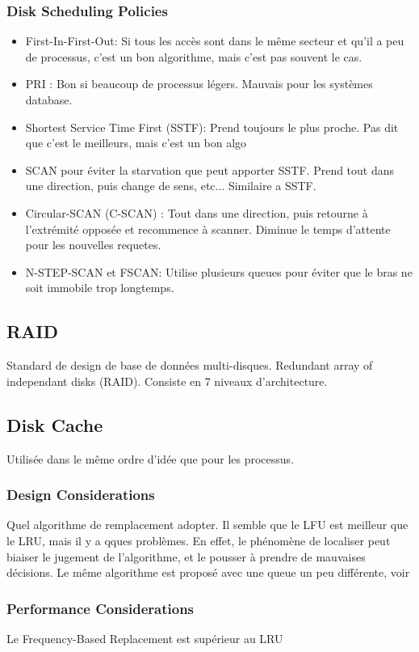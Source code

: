 \subsubsection{Disk Scheduling Policies}
\begin{itemize}
  \item First-In-First-Out: Si tous les accès sont dans le même secteur et qu'il a peu de processus, c'est un bon algorithme, mais c'est pas souvent le cas.
  \item PRI : Bon si beaucoup de processus légers.
    Mauvais pour les systèmes database.
  \item Shortest Service Time First (SSTF): Prend toujours le plus proche.
    Pas dit que c'est le meilleurs, mais c'est un bon algo
  \item SCAN pour éviter la starvation que peut apporter SSTF.
    Prend tout dans une direction, puis change de sens, etc...
    Similaire a SSTF.
  \item Circular-SCAN (C-SCAN) : Tout dans une direction, puis retourne à l'extrémité opposée et recommence à scanner.
    Diminue le temps d'attente pour les nouvelles requetes.
  \item N-STEP-SCAN et FSCAN: Utilise plusieurs queues pour éviter que le bras ne soit immobile trop longtemps.
\end{itemize}

\subsection{RAID}
Standard de design de base de données multi-disques.
Redundant array of independant disks (RAID).
Consiste en 7 niveaux d'architecture.
\subsection{Disk Cache}
Utilisée dans le même ordre d'idée que pour les processus.
\subsubsection{Design Considerations}
Quel algorithme de remplacement adopter.
Il semble que le LFU est meilleur que le LRU, mais il y a qques problèmes.
En effet, le phénomène de localiser peut biaiser le jugement de l'algorithme, et le pousser à prendre de mauvaises décisions.
Le même algorithme est proposé avec une queue un peu différente, voir \cite[p.~524]{stallings}
\subsubsection{Performance Considerations}
Le Frequency-Based Replacement est supérieur au LRU
